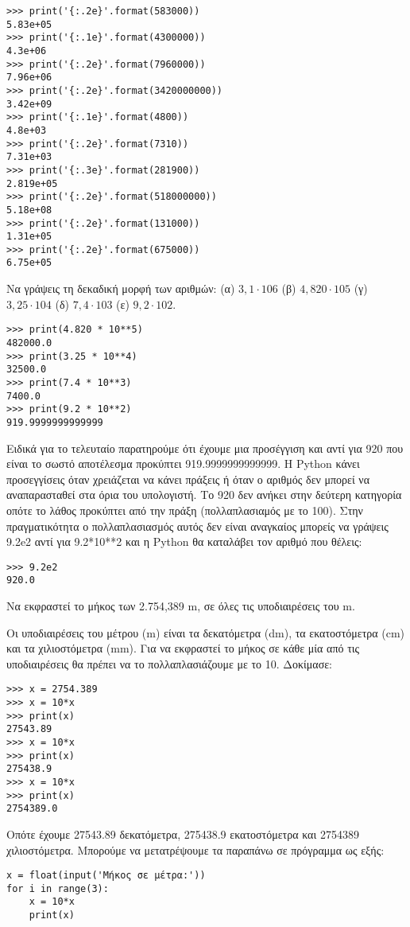 \begin{lstlisting}
>>> print('{:.2e}'.format(583000))
5.83e+05
>>> print('{:.1e}'.format(4300000))
4.3e+06
>>> print('{:.2e}'.format(7960000))
7.96e+06
>>> print('{:.2e}'.format(3420000000))
3.42e+09
>>> print('{:.1e}'.format(4800))
4.8e+03
>>> print('{:.2e}'.format(7310))
7.31e+03
>>> print('{:.3e}'.format(281900))
2.819e+05
>>> print('{:.2e}'.format(518000000))
5.18e+08
>>> print('{:.2e}'.format(131000))
1.31e+05
>>> print('{:.2e}'.format(675000))
6.75e+05
\end{lstlisting}
\begin{exercise}
Nα γράψεις τη δεκαδική μορφή των αριθμών:
(α) $3,1 \cdot 106$ (β) $4,820 \cdot 105$ (γ) $3,25 \cdot 104$ (δ) $7,4 \cdot 103$ (ε) $9,2 \cdot 102$.
\end{exercise}
\begin{lstlisting}
>>> print(4.820 * 10**5)
482000.0
>>> print(3.25 * 10**4)
32500.0
>>> print(7.4 * 10**3)
7400.0
>>> print(9.2 * 10**2)
919.9999999999999
\end{lstlisting}
Ειδικά για το τελευταίο παρατηρούμε ότι έχουμε μια προσέγγιση και αντί για 920 που είναι το σωστό αποτέλεσμα προκύπτει 919.9999999999999. H Python κάνει προσεγγίσεις όταν χρειάζεται να κάνει πράξεις ή όταν ο αριθμός δεν μπορεί να αναπαρασταθεί στα όρια του υπολογιστή. Το 920 δεν ανήκει στην δεύτερη κατηγορία οπότε το λάθος προκύπτει από την πράξη (πολλαπλασιαμός με το 100). Στην πραγματικότητα ο πολλαπλασιασμός αυτός δεν είναι αναγκαίος μπορείς να γράψεις 9.2e2 αντί για 9.2*10**2 και η Python θα καταλάβει τον αριθμό που θέλεις:
\begin{lstlisting}
>>> 9.2e2
920.0
\end{lstlisting}
\begin{exercise}
Nα εκφραστεί το μήκος των 2.754,389 m, σε όλες τις υποδιαιρέσεις του m.
\end{exercise}
Οι υποδιαιρέσεις του μέτρου (m) είναι τα δεκατόμετρα (dm), τα εκατοστόμετρα (cm) και τα χιλιοστόμετρα (mm).
Για να εκφραστεί το μήκος σε κάθε μία από τις υποδιαιρέσεις θα πρέπει να το πολλαπλασιάζουμε με το 10. 
Δοκίμασε:
\begin{lstlisting}
>>> x = 2754.389
>>> x = 10*x
>>> print(x)
27543.89
>>> x = 10*x
>>> print(x)
275438.9
>>> x = 10*x
>>> print(x)
2754389.0
\end{lstlisting}
Οπότε έχουμε 27543.89 δεκατόμετρα, 275438.9 εκατοστόμετρα και 2754389 χιλιοστόμετρα.
Μπορούμε να μετατρέψουμε τα παραπάνω σε πρόγραμμα ως εξής:
\begin{lstlisting}
x = float(input('Μήκος σε μέτρα:'))
for i in range(3):
    x = 10*x
    print(x)
\end{lstlisting}
